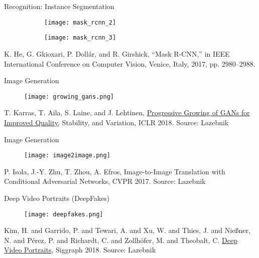 \begin{frame}{Recognition: Instance Segmentation}
    \begin{figure}[ht]
      \centering
      \begin{subfigure}[b]{0.5\linewidth}
        \centering\texttt{[image: mask\_rcnn\_2]}
        \caption{}\label{sf:digital_cameras}
      \end{subfigure}%
      \begin{subfigure}[b]{0.5\linewidth}
        \centering\texttt{[image: mask\_rcnn\_3]}
        \caption{}\label{sf:fr_software}
      \end{subfigure}
      \caption{}
    \end{figure}
    K. He, G. Gkioxari, P. Doll{\'a}r, and R. Girshick, ``Mask R-CNN,'' in IEEE International Conference on Computer Vision, Venice, Italy, 2017, pp. 2980--2988.
\end{frame}



\begin{frame}{Image Generation}
    \begin{figure}[ht]
      \centering
        \centering\texttt{[image: growing\_gans.png]}
    \end{figure}
    T. Karras, T. Aila, S. Laine, and J. Lehtinen, \href{https://www.youtube.com/watch?v=G06dEcZ-QTg&feature=youtu.be}{Progressive Growing of GANs for Improved Quality}, Stability, and Variation, ICLR 2018.
    \vfill
    \scriptsize{Source: Lazebnik}
\end{frame}

\begin{frame}{Image Generation}
    \begin{figure}[ht]
      \centering
        \centering\texttt{[image: image2image.png]}
    \end{figure}
    P. Isola, J.-Y. Zhu, T. Zhou, A. Efros, Image-to-Image Translation with Conditional Adversarial Networks, CVPR 2017.
    \vfill
    \scriptsize{Source: Lazebnik}
\end{frame}


\begin{frame}{Deep Video Portraits (DeepFakes)}
    \begin{figure}[ht]
      \centering
        \centering\texttt{[image: deepfakes.png]}
    \end{figure}
    Kim, H. and Garrido, P. and Tewari, A. and Xu, W. and Thies, J. and Nie{\ss}ner, N. and P{\'e}rez, P. and Richardt, C. and Zollh{\"o}fer, M. and Theobalt, C. \href{https://web.stanford.edu/~zollhoef/papers/SG2018_DeepVideo/page.html}{Deep Video Portraits}, Siggraph 2018.
    \vfill
    \scriptsize{Source: Lazebnik}
\end{frame}



